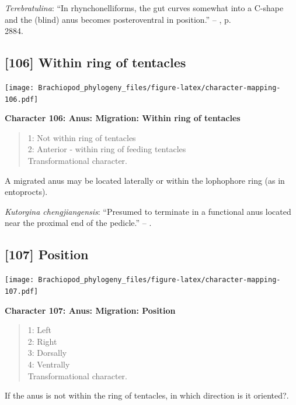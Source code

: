 \documentclass[openany]{book}
\theoremstyle{definition}
\theoremstyle{definition}
\theoremstyle{definition}
\theoremstyle{remark}
\begin{document}
\hypertarget{Terebratulina-coding-105}{}
\emph{Terebratulina}: ``In rhynchonelliforms, the gut curves somewhat
into a C-shape and the (blind) anus becomes posteroventral in
position.'' -- \citet{Williams2007Supplement}, p.\\
2884.

\subsection*{{[}106{]} Within ring of
tentacles}\label{within-ring-of-tentacles}

\texttt{[image: Brachiopod\_phylogeny\_files/figure-latex/character-mapping-106.pdf]}

\textbf{Character 106: Anus: Migration: Within ring of tentacles}

\begin{quote}
1: Not within ring of tentacles\\
2: Anterior - within ring of feeding tentacles\\
Transformational character.
\end{quote}

A migrated anus may be located laterally or within the lophophore ring
(as in entoprocts).

\hypertarget{Kutorgina_chengjiangensis-coding-106}{}
\emph{Kutorgina chengjiangensis}: ``Presumed to terminate in a
functional anus located near the proximal end of the pedicle.'' --
\citet{Zhang2007Rhynchonelliformeanbrachiopods}.

\subsection*{{[}107{]} Position}\label{position}

\texttt{[image: Brachiopod\_phylogeny\_files/figure-latex/character-mapping-107.pdf]}

\textbf{Character 107: Anus: Migration: Position}

\begin{quote}
1: Left\\
2: Right\\
3: Dorsally\\
4: Ventrally\\
Transformational character.
\end{quote}

If the anus is not within the ring of tentacles, in which direction is
it oriented?.
\end{document}
